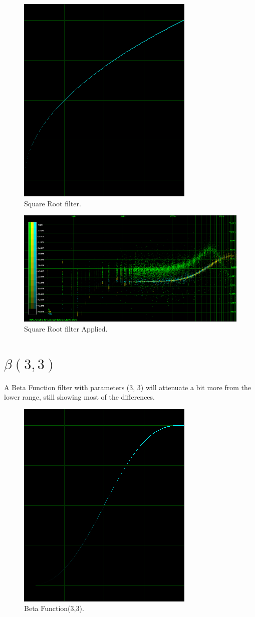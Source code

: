 \documentclass[10pt,a4paper]{report}
\begin{document}
\begin{appendices}
\begin{figure}[H]
	\centering
	\includegraphics[width=0.4\linewidth]{images/colorfilter/BetaFunctionPlot_1.png}
	\caption[Square Root filter]{Square Root filter.}
	\label{fig:betafunctionplot1}
\end{figure}

\begin{figure}[H]
	\centering
	\includegraphics[width=1\linewidth]{images/colorfilter/BetaFunctionPlot_1_Data.png}
	\caption[Square Root filter]{Square Root filter Applied.}
	\label{fig:betafunctionplot1data}
\end{figure}

\section{$\beta(3,3)$}

A Beta Function filter with parameters (3, 3) will attenuate a bit more from the lower range, still showing most of the differences.

\begin{figure}[H]
	\centering
	\includegraphics[width=0.4\linewidth]{images/colorfilter/BetaFunctionPlot_2.png}
	\caption[Beta Function(3,3)]{Beta Function(3,3).}
	\label{fig:betafunctionplot2}
\end{figure}


\end{appendices}
\end{document}
